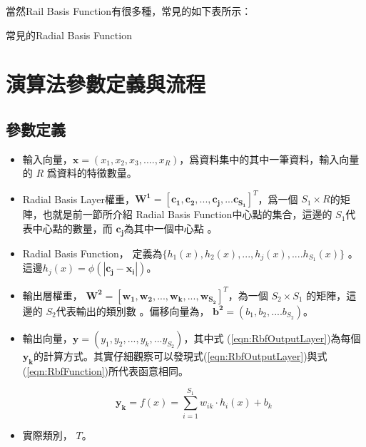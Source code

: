 當然Rail Basis Function有很多種，常見的如下表所示：
\\

\begin{table}[h!]
	\centering
	\label{tab:rbf_table}
	
	\caption{常見的Radial Basis Function}
\end{table}






\section{演算法參數定義與流程}




\subsection{參數定義}
\begin{itemize}
	\item
	      輸入向量，\(\mathbf{x} = (x_1,x_2,x_3,....,x_R)\)，爲資料集中的其中一筆資料，輸入向量的 \(R\) 爲資料的特徵數量。
	\item
	      Radial Basis Layer權重，\(\mathbf{W^1} = [\mathbf{c_1,c_2,...,c_j,...c_{S_1}}]^T\)，爲一個 \(S_1 \times R \)的矩陣，也就是前一節所介紹 Radial Basis Function中心點的集合，這邊的 \(S_1\)代表中心點的數量，而 \(\mathbf{c_j}\)為其中一個中心點 。
	\item
	      Radial Basis Function， 定義為\(\{h_1(x), h_2(x),...,h_j(x),....h_{S_1}(x) \}\)  。
	      這邊$h_j(x)=\phi(\mathbf{|c_j-x_i|})$。


	\item
	      輸出層權重， \(\mathbf{W^2}= [\mathbf{w_1,w_2,...,w_k,...,w_{S_2}}]^T\)，為一個 \(S_2 \times S_1\) 的矩陣，這邊的 \(S_2\)代表輸出的類別數 。偏移向量為， \(\mathbf{b^2}=(b_1,b_2,....b_{S_2})\)。
	\item
	      輸出向量，\(\mathbf{y}= (y_1,y_2,...,y_k,...y_{S_2})\)，其中式 (\ref{eqn:RbfOutputLayer})為每個 \(\mathbf{y_k}\)的計算方式。其實仔細觀察可以發現式(\ref{eqn:RbfOutputLayer})與式(\ref{eqn:RbfFunction})所代表函意相同。

	      \begin{equation}
		      \label{eqn:RbfOutputLayer}
		      \mathbf{y_k}= f(x) = \sum_{i=1}^{S_1}w_{ik}\cdot h_i(x)+b_k
	      \end{equation}
	\item
	      實際類別， \(T\)。
\end{itemize}

